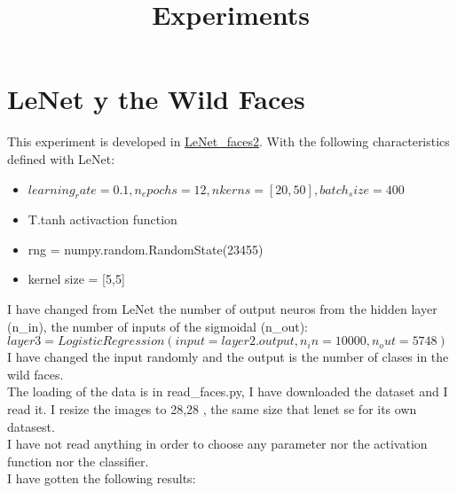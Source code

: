 \documentclass[a4paper]{article}
\begin{document}
\title{Experiments}
\maketitle



\section{LeNet y the Wild Faces}

This experiment is developed in \url{LeNet_faces2}. With the following characteristics defined with LeNet:\\

\begin{itemize}
\item $learning_rate=0.1, n_epochs=12, nkerns=[20, 50], batch_size=400$
\item  T.tanh activaction function
\item rng = numpy.random.RandomState(23455)
\item kernel size = [5,5]
\end{itemize}


I have changed from LeNet the number of output neuros from the hidden layer (n\_in), the number of inputs of the sigmoidal (n\_out):\\

$layer3 = LogisticRegression(input=layer2.output, n_in=10000, n_out=5748)$\\

I have changed the input randomly and the output is the number of clases in the wild faces.\\

The loading of the data is in read\_faces.py, I have downloaded the dataset and I read it. I resize the images to 28,28 , the same size that lenet se for its own datasest.\\

I have not read anything in order to choose any parameter nor the activation function nor the classifier.\\

I have gotten the following results:\\
\end{document}
